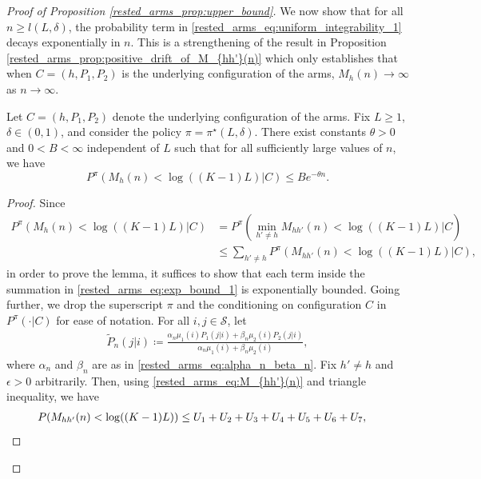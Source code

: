\begin{proof}[Proof of Proposition \ref{rested_arms_prop:upper_bound}]
We now show that for all $n\geq l(L,\delta)$, the probability term in \eqref{rested_arms_eq:uniform_integrability_1} decays exponentially in $n$. This is a strengthening of the result in Proposition \ref{rested_arms_prop:positive_drift_of_M_{hh'}(n)} which only establishes that when $C=(h,P_1,P_2)$ is the underlying configuration of the arms, $M_h(n)\to\infty$ as $n\to\infty$.

\begin{lemma}\label{rested_arms_lemma:exp_bound}
	Let $C=(h,P_1,P_2)$ denote the underlying configuration of the arms. Fix $L\geq 1$, $\delta\in(0,1)$, and consider the policy $\pi=\pi^{\star}(L,\delta)$. There exist constants $\theta>0$ and $0<B<\infty$ independent of $L$ such that for all sufficiently large values of $n$, we have
	\begin{equation}
		P^\pi(M_h(n)<\log((K-1)L)|C)\leq Be^{-\theta n}.\label{rested_arms_eq:exponential_bound}
	\end{equation}
\end{lemma}
\begin{proof}
Since
\begingroup\allowdisplaybreaks\begin{align}
	P^\pi(M_h(n)<\log((K-1)L)|C)
	&=P^\pi\left(\min\limits_{h'\neq h}M_{hh'}(n)<\log((K-1)L)\bigg|C\right)\nonumber\\
	&\leq \sum\limits_{h'\neq h}P^\pi\left(M_{hh'}(n)<\log((K-1)L)\bigg|C\right),\label{rested_arms_eq:exp_bound_1}
\end{align}\endgroup
in order to prove the lemma, it suffices to show that each term inside the summation in \eqref{rested_arms_eq:exp_bound_1} is exponentially bounded. Going further, we drop the superscript $\pi$ and the conditioning on configuration $C$ in $P^\pi(\cdot|C)$ for ease of notation. For all $i,j\in\mathcal{S}$, let
\begingroup\allowdisplaybreaks\begin{align}
	\tilde{P}_{n}(j|i)\coloneqq \frac{\alpha_n \mu_1(i) P_1(j|i)+\beta_n \mu_2(i)P_2(j|i)}{\alpha_n \mu_1(i)+\beta_n \mu_2(i)},\label{rested_arms_eq:tilde_P_n}
\end{align}\endgroup
where $\alpha_n$ and $\beta_n$ are as in \eqref{rested_arms_eq:alpha_n_beta_n}. Fix $h'\neq h$ and $\epsilon>0$ arbitrarily. Then, using \eqref{rested_arms_eq:M_{hh'}(n)} and triangle inequality, we have
\begingroup\allowdisplaybreaks\begin{align}
	P(M_{hh'}(n)<\log((K-1)L))
	&\leq U_1+U_2+U_3+U_4+U_5+U_6+U_7,\label{rested_arms_eq:P(M_{hh'}(n)<log((K-1)L))}
\end{align}\endgroup

\end{proof}
\end{proof}
